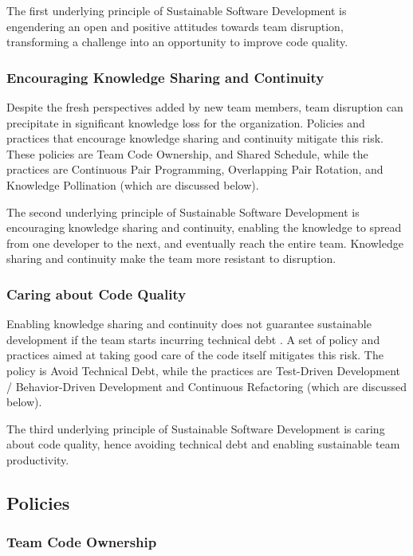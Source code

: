 The first underlying principle of Sustainable Software Development is engendering an open and positive attitudes towards team disruption, transforming a challenge into an opportunity to improve code quality.

\subsubsection{Encouraging Knowledge Sharing and Continuity}
Despite the fresh perspectives added by new team members, team disruption can precipitate in significant knowledge loss for the organization. Policies and practices that encourage knowledge sharing and continuity mitigate this risk. These policies are Team Code Ownership, and Shared Schedule, while the practices are Continuous Pair Programming, Overlapping Pair Rotation, and Knowledge Pollination (which are discussed below).

The second underlying principle of Sustainable Software Development is encouraging knowledge sharing and continuity, enabling the knowledge to spread from one developer to the next, and eventually reach the entire team. Knowledge sharing and continuity make the team more resistant to disruption. 

\subsubsection{Caring about Code Quality}

Enabling knowledge sharing and continuity does not guarantee sustainable development if the team starts incurring technical debt \cite{McConnellTechnicalDebt}. A set of policy and practices aimed at taking good care of the code itself mitigates this risk. The policy is Avoid Technical Debt, while the practices are Test-Driven Development / Behavior-Driven Development and Continuous Refactoring (which are discussed below).

The third underlying principle of Sustainable Software Development is caring about code quality, hence avoiding technical debt and enabling sustainable team productivity.
\subsection{Policies}

\subsubsection{Team Code Ownership}

